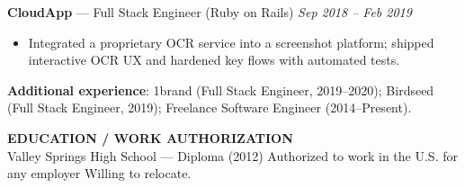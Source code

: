 \documentclass[10pt]{article}
\begin{document}
\textbf{CloudApp} --- Full Stack Engineer (Ruby on Rails) \hfill \textit{Sep 2018 -- Feb 2019}\\
\vspace{-6pt}
\begin{itemize}
  \setlength\itemsep{-2pt}
  \setlength\parskip{0pt}
  \setlength\parsep{0pt}
  \item Integrated a proprietary OCR service into a screenshot platform; shipped interactive OCR UX and hardened key flows with automated tests.
\end{itemize}

\textbf{Additional experience}: 1brand (Full Stack Engineer, 2019--2020); Birdseed (Full Stack Engineer, 2019); Freelance Software Engineer (2014--Present).

\vspace{4pt}
\textbf{EDUCATION / WORK AUTHORIZATION}\\
Valley Springs High School --- Diploma (2012) \;\textbar\; Authorized to work in the U.S. for any employer \;\textbar\; Willing to relocate.
\end{document}
